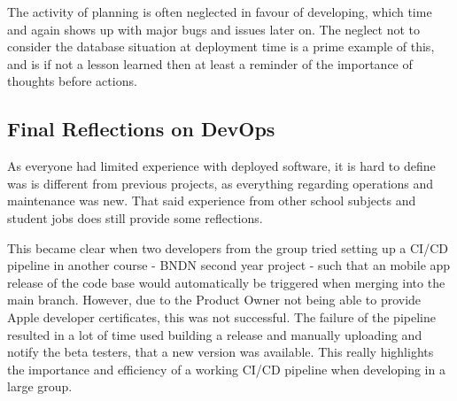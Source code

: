 \documentclass[report/main.tex]{subfiles}
\begin{document}
            The activity of planning is often neglected in favour of developing, which time and again shows up with major bugs and issues later on. The neglect not to consider the database situation at deployment time is a prime example of this, and is if not a lesson learned then at least a reminder of the importance of thoughts before actions.
        
        \subsection{Final Reflections on DevOps}
        \label{subsec:final-reflections-on-devops}
            As everyone had limited experience with deployed software, it is hard to define was is different from previous projects, as everything regarding operations and maintenance was new. That said experience from other school subjects and student jobs does still provide some reflections.
            
            
            This became clear when two developers from the group tried setting up a CI/CD pipeline in another course - BNDN second year project - such that an mobile app release of the code base would automatically be triggered when merging into the main branch. However, due to the Product Owner not being able to provide Apple developer certificates, this was not successful. The failure of the pipeline resulted in a lot of time used building a release and manually uploading and notify the beta testers, that a new version was available. This really highlights the importance and efficiency of a working CI/CD pipeline when developing in a large group. 
            
\end{document}
